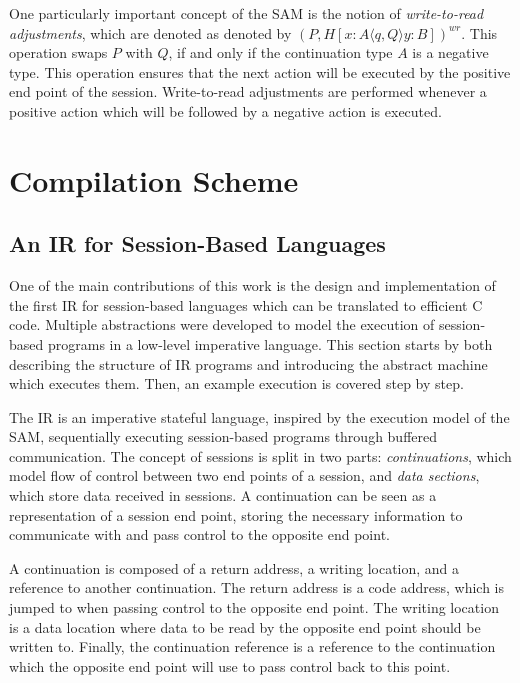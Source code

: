 \documentclass[sigconf,nonacm,natbib=true]{acmart}
\begin{document}
One particularly important concept of the \ac{SAM}  is the notion of \textit{write-to-read adjustments}, which are denoted as denoted by $(P,H[x:A\langle q,Q\rangle y:B])^{wr}$. This operation swaps $P$ with $Q$, if and only if the continuation type $A$ is a negative type. This operation ensures that the next action will be executed by the positive end point of the session. Write-to-read adjustments are performed whenever a positive action which will be followed by a negative action is executed.

\section{Compilation Scheme}

\subsection{An IR for Session-Based Languages}

One of the main contributions of this work is the design and implementation of the first \acf{IR} for session-based languages which can be translated to efficient C code. Multiple abstractions were developed to model the execution of session-based programs in a low-level imperative language. This section starts by both describing the structure of \ac{IR} programs and introducing the abstract machine which executes them. Then, an example execution is covered step by step.

The \ac{IR} is an imperative stateful language, inspired by the execution model of the \ac{SAM}, sequentially executing session-based programs through buffered communication. The concept of sessions is split in two parts: \textit{continuations}, which model flow of control between two end points of a session, and \textit{data sections}, which store data received in sessions. A continuation can be seen as a representation of a session end point, storing the necessary information to communicate with and pass control to the opposite end point.

A continuation is composed of a return address, a writing location, and a reference to another continuation. The return address is a code address, which is jumped to when passing control to the opposite end point. The writing location is a data location where data to be read by the opposite end point should be written to. Finally, the continuation reference is a reference to the continuation which the opposite end point will use to pass control back to this point.
\end{document}
